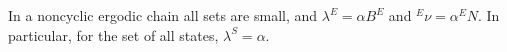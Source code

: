 In a noncyclic ergodic chain all sets are small, and $\lambda^E = \alpha B^E$ and $^E \nu = \alpha^E N$. In particular, for the set of all states, $\lambda^S = \alpha$.
